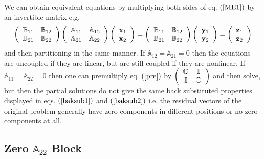 \documentclass[aps,preprint]{revtex4}%
\begin{document}
We can obtain equivalent equations by multiplying both sides of eq. $\left(
\ref{ME1}\right)  $ by an invertible matrix e.g.
\begin{equation}
\left(
\begin{array}
[c]{cc}%
\mathbb{B}_{11} & \mathbb{B}_{12}\\
\mathbb{B}_{21} & \mathbb{B}_{22}%
\end{array}
\right)  \left(
\begin{array}
[c]{cc}%
\mathbb{A}_{11} & \mathbb{A}_{12}\\
\mathbb{A}_{21} & \mathbb{A}_{22}%
\end{array}
\right)  \left(
\begin{array}
[c]{c}%
\mathbf{x}_{1}\\
\mathbf{x}_{2}%
\end{array}
\right)  =\left(
\begin{array}
[c]{cc}%
\mathbb{B}_{11} & \mathbb{B}_{12}\\
\mathbb{B}_{21} & \mathbb{B}_{22}%
\end{array}
\right)  \left(
\begin{array}
[c]{c}%
\mathbf{y}_{1}\\
\mathbf{y}_{2}%
\end{array}
\right)  =\left(
\begin{array}
[c]{c}%
\mathbf{z}_{1}\\
\mathbf{z}_{2}%
\end{array}
\right)  \label{pre}%
\end{equation}
and then partitioning in the same manner. If $\mathbb{A}_{12}=\mathbb{A}%
_{21}=0$ then the equations are uncoupled if they are linear, but are still
coupled if they are nonlinear. If $\mathbb{A}_{11}=\mathbb{A}_{22}=0$ then one
can premultiply eq. $\left(  \ref{pre}\right)  $ by $\left(
\begin{array}
[c]{cc}%
\mathbb{O} & \mathbb{I}\\
\mathbb{I} & \mathbb{O}%
\end{array}
\right)  $ and then solve, but then the partial solutions do not give the same
back substituted properties displayed in eqs. $\left(  \ref{baksub1}\right)  $
and $\left(  \ref{baksub2}\right)  $ i.e. the residual vectors of the original
problem generally have zero components in different positions or no zero
components at all.

\subsection{Zero $\mathbb{A}_{22}$ Block}
\end{document}
